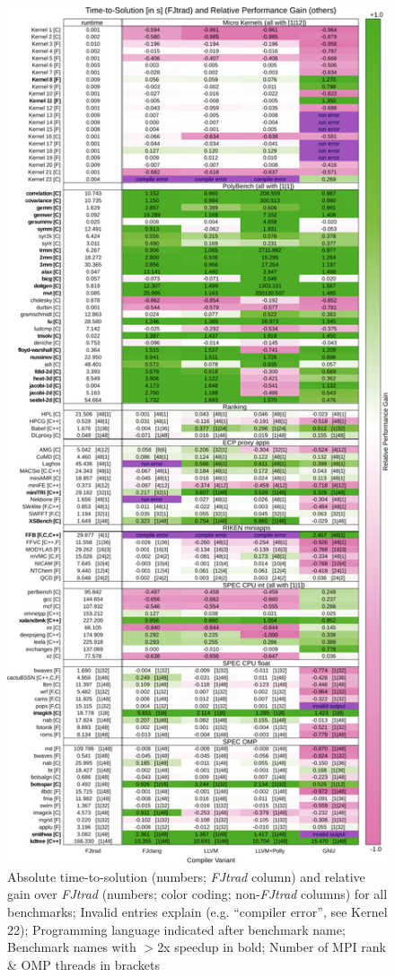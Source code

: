 \documentclass[conference,compsoc]{IEEEtran}
\begin{document}
\begin{figure}[tbhp]
    \centering
    \includegraphics[width=1.085\linewidth]{compiler_compare}
    \caption{Absolute time-to-solution (numbers; \textit{FJtrad} column) and relative gain over \textit{FJtrad} (numbers; color coding; non-\textit{FJtrad} columns)
    for all benchmarks; Invalid entries explain (e.g. ``compiler error'', see Kernel 22); Programming
    language indicated after benchmark name; Benchmark names with $>$2x speedup in bold; Number of MPI rank \& OMP threads in brackets}
    \label{fig:compare_compiler}
\end{figure}
\end{document}
